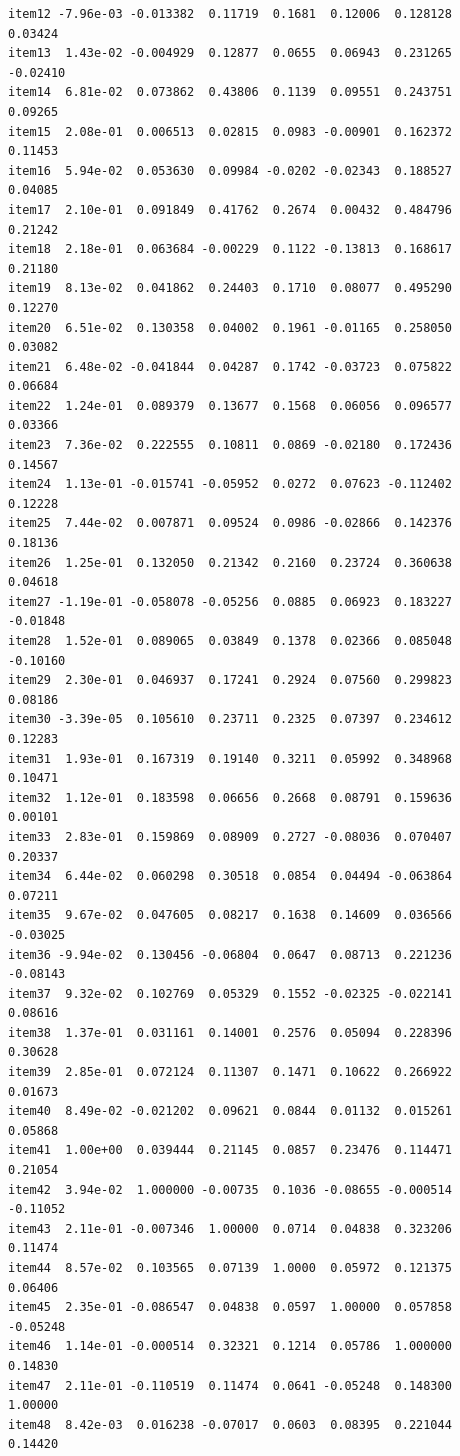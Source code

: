 \documentclass[
  a4paper,
]{ltjsbook}
\begin{document}
\begin{verbatim}
item12 -7.96e-03 -0.013382  0.11719  0.1681  0.12006  0.128128  0.03424
item13  1.43e-02 -0.004929  0.12877  0.0655  0.06943  0.231265 -0.02410
item14  6.81e-02  0.073862  0.43806  0.1139  0.09551  0.243751  0.09265
item15  2.08e-01  0.006513  0.02815  0.0983 -0.00901  0.162372  0.11453
item16  5.94e-02  0.053630  0.09984 -0.0202 -0.02343  0.188527  0.04085
item17  2.10e-01  0.091849  0.41762  0.2674  0.00432  0.484796  0.21242
item18  2.18e-01  0.063684 -0.00229  0.1122 -0.13813  0.168617  0.21180
item19  8.13e-02  0.041862  0.24403  0.1710  0.08077  0.495290  0.12270
item20  6.51e-02  0.130358  0.04002  0.1961 -0.01165  0.258050  0.03082
item21  6.48e-02 -0.041844  0.04287  0.1742 -0.03723  0.075822  0.06684
item22  1.24e-01  0.089379  0.13677  0.1568  0.06056  0.096577  0.03366
item23  7.36e-02  0.222555  0.10811  0.0869 -0.02180  0.172436  0.14567
item24  1.13e-01 -0.015741 -0.05952  0.0272  0.07623 -0.112402  0.12228
item25  7.44e-02  0.007871  0.09524  0.0986 -0.02866  0.142376  0.18136
item26  1.25e-01  0.132050  0.21342  0.2160  0.23724  0.360638  0.04618
item27 -1.19e-01 -0.058078 -0.05256  0.0885  0.06923  0.183227 -0.01848
item28  1.52e-01  0.089065  0.03849  0.1378  0.02366  0.085048 -0.10160
item29  2.30e-01  0.046937  0.17241  0.2924  0.07560  0.299823  0.08186
item30 -3.39e-05  0.105610  0.23711  0.2325  0.07397  0.234612  0.12283
item31  1.93e-01  0.167319  0.19140  0.3211  0.05992  0.348968  0.10471
item32  1.12e-01  0.183598  0.06656  0.2668  0.08791  0.159636  0.00101
item33  2.83e-01  0.159869  0.08909  0.2727 -0.08036  0.070407  0.20337
item34  6.44e-02  0.060298  0.30518  0.0854  0.04494 -0.063864  0.07211
item35  9.67e-02  0.047605  0.08217  0.1638  0.14609  0.036566 -0.03025
item36 -9.94e-02  0.130456 -0.06804  0.0647  0.08713  0.221236 -0.08143
item37  9.32e-02  0.102769  0.05329  0.1552 -0.02325 -0.022141  0.08616
item38  1.37e-01  0.031161  0.14001  0.2576  0.05094  0.228396  0.30628
item39  2.85e-01  0.072124  0.11307  0.1471  0.10622  0.266922  0.01673
item40  8.49e-02 -0.021202  0.09621  0.0844  0.01132  0.015261  0.05868
item41  1.00e+00  0.039444  0.21145  0.0857  0.23476  0.114471  0.21054
item42  3.94e-02  1.000000 -0.00735  0.1036 -0.08655 -0.000514 -0.11052
item43  2.11e-01 -0.007346  1.00000  0.0714  0.04838  0.323206  0.11474
item44  8.57e-02  0.103565  0.07139  1.0000  0.05972  0.121375  0.06406
item45  2.35e-01 -0.086547  0.04838  0.0597  1.00000  0.057858 -0.05248
item46  1.14e-01 -0.000514  0.32321  0.1214  0.05786  1.000000  0.14830
item47  2.11e-01 -0.110519  0.11474  0.0641 -0.05248  0.148300  1.00000
item48  8.42e-03  0.016238 -0.07017  0.0603  0.08395  0.221044  0.14420

\end{verbatim}
\end{document}
